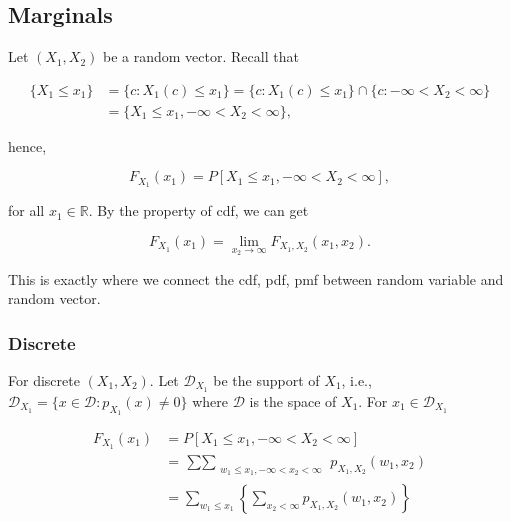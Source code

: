 \documentclass{article}
\begin{document}
        \subsection{Marginals}

            Let $ (X_{1}, X_{2}) $ be a random vector. Recall that

            \begin{align*}
                \{ X_{1} \leq x_{1} \} &= \{ c : X_{1}(c) \leq x_{1} \}
                    = \{ c: X_{1}(c) \leq x_{1} \} \cap \{ c: -\infty < X_{2} < \infty \} \\
                                       &= \{ X_{1} \leq x_{1}, -\infty < X_{2} < \infty \},
            \end{align*}

            hence,

            \begin{equation*}
                F_{X_{1}}(x_{1}) = P[ X_{1} \leq x_{1}, -\infty < X_{2} < \infty ],
            \end{equation*}

            for all $ x_{1} \in \mathbb{R} $. By the property of cdf, we can get

            \begin{equation*}
                 F_{X_{1}}(x_{1}) = \lim_{x_{2} \rightarrow \infty} F_{X_{1}, X_{2}} (x_{1}, x_{2}).
            \end{equation*}

            This is exactly where we connect the cdf, pdf, pmf between random
            variable and random vector.

            \subsubsection{Discrete}

                For discrete $ (X_{1}, X_{2}) $. Let $ \mathcal{D}_{X_{1}} $ be the support of $ X_{1} $, i.e.,
                $ \mathcal{D}_{X_{1}} = \{ x \in \mathcal{D} : p_{X_{1}}(x) \neq 0 \} $ where $ \mathcal{D} $ is
                the space of $ X_{1} $. For $ x_{1} \in \mathcal{D}_{X_{1}} $

                \begin{align*}
                    F_{X_{1}}(x_{1}) &= P [ X_{1} \leq x_{1}, -\infty < X_{2} < \infty ] \\
                                     &= \mathop{\sum \sum}_{\substack{w_{1} \leq x_{1}, -\infty < x_{2} < \infty }}
                                        p_{X_{1}, X_{2}}(w_{1}, x_{2}) \\
                                     &= \sum_{ w_{1} \leq x_{1}} \left\{ \sum_{ x_{2} < \infty}
                                            p_{X_{1}, X_{2}}(w_{1}, x_{2})
                                        \right\}
                \end{align*}
\end{document}
